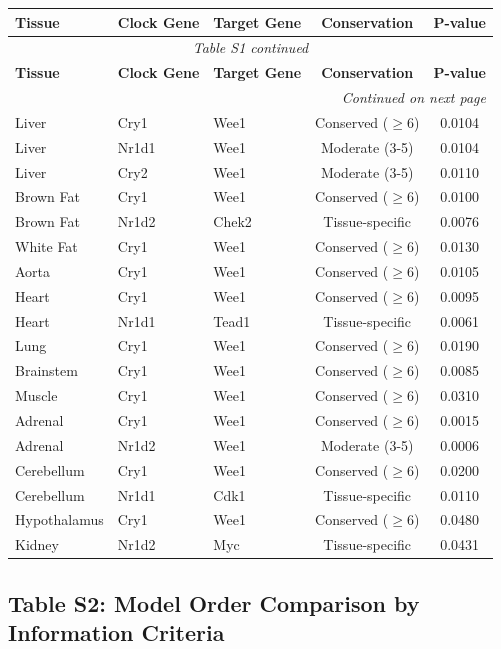 \documentclass[11pt,a4paper]{article}
\begin{document}
\begin{longtable}{lllcc}
\toprule
\textbf{Tissue} & \textbf{Clock Gene} & \textbf{Target Gene} & \textbf{Conservation} & \textbf{P-value} \\
\midrule
\endfirsthead
\multicolumn{5}{c}{\textit{Table S1 continued}} \\
\toprule
\textbf{Tissue} & \textbf{Clock Gene} & \textbf{Target Gene} & \textbf{Conservation} & \textbf{P-value} \\
\midrule
\endhead
\midrule
\multicolumn{5}{r}{\textit{Continued on next page}} \\
\endfoot
\bottomrule
\endlastfoot
Liver & Cry1 & Wee1 & Conserved ($\geq$6) & 0.0104 \\
Liver & Nr1d1 & Wee1 & Moderate (3-5) & 0.0104 \\
Liver & Cry2 & Wee1 & Moderate (3-5) & 0.0110 \\
Brown Fat & Cry1 & Wee1 & Conserved ($\geq$6) & 0.0100 \\
Brown Fat & Nr1d2 & Chek2 & Tissue-specific & 0.0076 \\
White Fat & Cry1 & Wee1 & Conserved ($\geq$6) & 0.0130 \\
Aorta & Cry1 & Wee1 & Conserved ($\geq$6) & 0.0105 \\
Heart & Cry1 & Wee1 & Conserved ($\geq$6) & 0.0095 \\
Heart & Nr1d1 & Tead1 & Tissue-specific & 0.0061 \\
Lung & Cry1 & Wee1 & Conserved ($\geq$6) & 0.0190 \\
Brainstem & Cry1 & Wee1 & Conserved ($\geq$6) & 0.0085 \\
Muscle & Cry1 & Wee1 & Conserved ($\geq$6) & 0.0310 \\
Adrenal & Cry1 & Wee1 & Conserved ($\geq$6) & 0.0015 \\
Adrenal & Nr1d2 & Wee1 & Moderate (3-5) & 0.0006 \\
Cerebellum & Cry1 & Wee1 & Conserved ($\geq$6) & 0.0200 \\
Cerebellum & Nr1d1 & Cdk1 & Tissue-specific & 0.0110 \\
Hypothalamus & Cry1 & Wee1 & Conserved ($\geq$6) & 0.0480 \\
Kidney & Nr1d2 & Myc & Tissue-specific & 0.0431 \\
\end{longtable}

\subsection*{Table S2: Model Order Comparison by Information Criteria}
\end{document}
